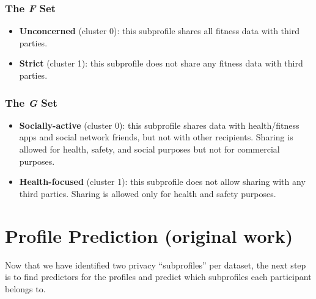 \subsubsection{The \textit{F} Set}
\begin{itemize}
	\item \textbf{Unconcerned} (cluster 0): this subprofile shares all fitness data with third parties.
	
	\item \textbf{Strict} (cluster 1): this subprofile does not share any fitness data with third parties.
\end{itemize}


\subsubsection{The \textit{G} Set}
\begin{itemize}
	\item \textbf{Socially-active} (cluster 0): this subprofile shares data with health/fitness apps and social network friends, but not with other recipients. %
	Sharing is allowed for health, safety, and social purposes but not for commercial purposes.
	
	\item \textbf{Health-focused} (cluster 1): this subprofile does not allow sharing with any third parties. Sharing is allowed only for health and safety purposes. 
\end{itemize}

\section{Profile Prediction (original work)}
\label{sec:prediction}


Now that we have identified two privacy ``subprofiles'' per dataset, the next step is to find predictors for the profiles and predict which subprofiles each participant belongs to.  


